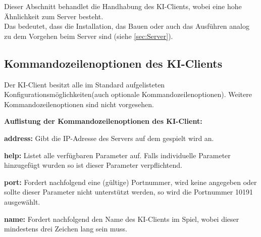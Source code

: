 \documentclass[12pt]{article}
\begin{document}
Dieser Abschnitt behandlet die Handhabung des KI-Clients, wobei eine hohe Ähnlichkeit zum Server besteht. \\ Das bedeutet, dass die Installation, 
das Bauen oder auch das Ausführen analog zu dem Vorgehen beim Server sind (siehe \autoref{sec:Server}). 

\subsection{Kommandozeilenoptionen des KI-Clients}

Der KI-Client besitzt alle im Standard aufgelisteten Konfigurationsmöglichkeiten(auch optionale Kommandozeilenoptionen). Weitere Kommandozeilenoptionen sind nicht vorgesehen.

\textbf{Auflistung der Kommandozeilenoptionen des KI-Client:}

\textbf{address:} Gibt die IP-Adresse des Servers auf dem gespielt wird an.

\textbf{help:} Listet alle verfügbaren Parameter auf. Falls individuelle Parameter hinzugefügt wurden so ist dieser Parameter verpflichtend.

\textbf{port:} Fordert nachfolgend eine (gültige) Portnummer, wird keine angegeben oder sollte dieser Parameter
nicht unterstützt werden, so wird die Portnummer 10191 ausgewählt.

\textbf{name:} Fordert nachfolgend den Name des KI-Clients im Spiel, wobei dieser mindestens drei Zeichen lang
sein muss.
\end{document}
